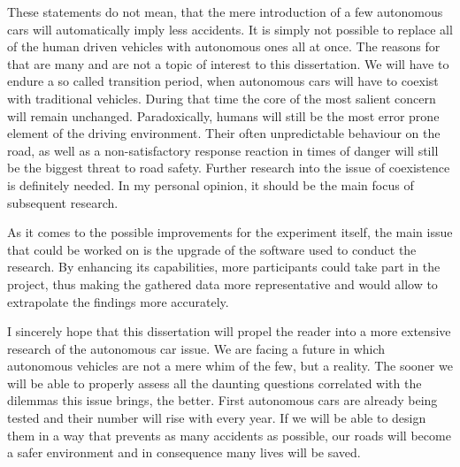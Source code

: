 \documentclass[11pt,english]{article}
\begin{document}
These statements do not mean, that the mere introduction of a few autonomous cars will automatically imply less accidents. It is simply not possible to replace all of the human driven vehicles with autonomous ones all at once. The reasons for that are many and are not a topic of interest to this dissertation. We will have to endure a so called transition period, when autonomous cars will have to coexist with traditional vehicles. During that time the core of the most salient concern will remain unchanged. Paradoxically, humans will still be the most error prone element of the driving environment. Their often unpredictable behaviour on the road, as well as a non-satisfactory response reaction in times of danger will still be the biggest threat to road safety. Further research into the issue of coexistence is definitely needed. In my personal opinion, it should be the main focus of subsequent research. 



As it comes to the possible improvements for the experiment itself, the main issue that could be worked on is the upgrade of the software used to conduct the research. By enhancing its capabilities, more participants could take part in the project, thus making the gathered data more representative and would allow to extrapolate the findings more accurately.


 
I sincerely hope that this dissertation will propel the reader into a more extensive research of the autonomous car issue. We are facing a future in which autonomous vehicles are not a mere whim of the few, but a reality. The sooner we will be able to properly assess all the daunting questions correlated with the dilemmas this issue brings, the better. First autonomous cars are already being tested and their number will rise with every year. If we will be able to design them in a way that prevents as many accidents as possible, our roads will  become a safer environment and in consequence many lives will be saved.











\end{document}
